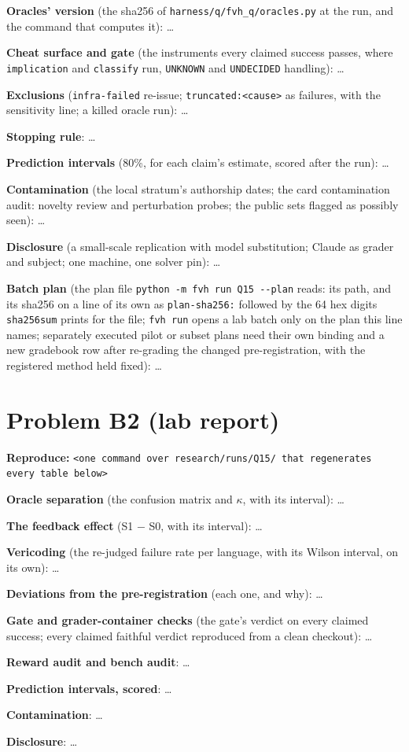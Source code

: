 \documentclass[11pt]{article}
\begin{document}
\begin{answer}
\textbf{Oracles' version} (the sha256 of \texttt{harness/q/fvh\_q/oracles.py}
at the run, and the command that computes it): \dots

\textbf{Cheat surface and gate} (the instruments every claimed success passes,
where \texttt{implication} and \texttt{classify} run, \texttt{UNKNOWN} and
\texttt{UNDECIDED} handling): \dots

\textbf{Exclusions} (\texttt{infra-failed} re-issue; \texttt{truncated:<cause>}
as failures, with the sensitivity line; a killed oracle run): \dots

\textbf{Stopping rule}: \dots

\textbf{Prediction intervals} (80\%, for each claim's estimate, scored after
the run): \dots

\textbf{Contamination} (the local stratum's authorship dates; the card
contamination audit: novelty review and perturbation probes; the public sets
flagged as possibly seen): \dots

\textbf{Disclosure} (a small-scale replication with model substitution; Claude as
grader and subject; one machine, one solver pin): \dots

\textbf{Batch plan} (the plan file \texttt{python -m fvh run Q15 -{}-plan}
reads: its path, and its sha256 on a line of its own as \texttt{plan-sha256:}
followed by the 64 hex digits \texttt{sha256sum} prints for the file;
\texttt{fvh run} opens a lab batch only on the plan this line names;
separately executed pilot or subset plans need their own binding and a new
gradebook row after re-grading the changed pre-registration, with the
registered method held fixed): \dots
\end{answer}

\section*{Problem B2 (lab report)}\label{ans:B2}
\begin{answer}
\textbf{Reproduce:} \verb+<one command over research/runs/Q15/ that regenerates every table below>+

\textbf{Oracle separation} (the confusion matrix and $\kappa$, with its
interval): \dots

\textbf{The feedback effect} (S1 $-$ S0, with its interval): \dots

\textbf{Vericoding} (the re-judged failure rate per language, with its Wilson
interval, on its own): \dots

\textbf{Deviations from the pre-registration} (each one, and why): \dots

\textbf{Gate and grader-container checks} (the gate's verdict on every claimed
success; every claimed faithful verdict reproduced from a clean checkout):
\dots

\textbf{Reward audit and bench audit}: \dots

\textbf{Prediction intervals, scored}: \dots

\textbf{Contamination}: \dots

\textbf{Disclosure}: \dots
\end{answer}
\end{document}
